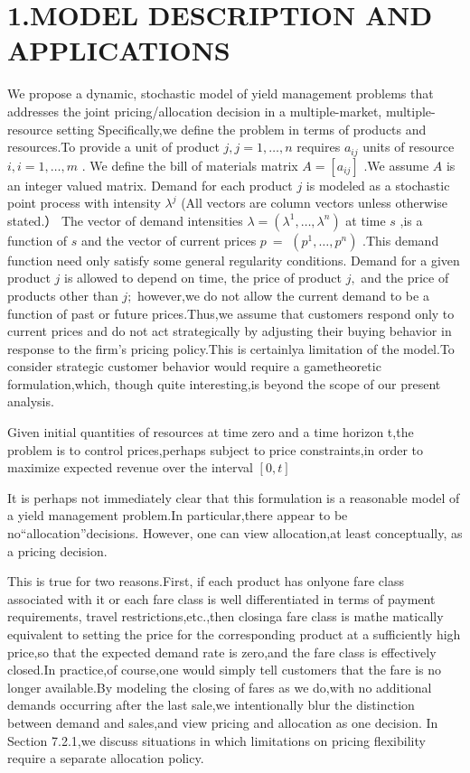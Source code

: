 \section{1.MODEL DESCRIPTION AND
APPLICATIONS}\label{model-description-and-applications}

We propose a dynamic, stochastic model of yield management problems that
addresses the joint pricing/allocation decision in a multiple-market,
multiple-resource setting Specifically,we define the problem in terms of
products and resources.To provide a unit of product
\(j , j = 1 , \ldots , n\) requires \(a _ { i j }\) units of resource
\(i , i = 1 , \ldots , m\) . We define the bill of materials matrix
\(A = [ a _ { i j } ]\) .We assume \(A\) is an integer valued matrix.
Demand for each product \(j\) is modeled as a stochastic point process
with intensity \(\lambda ^ { j }\) (All vectors are column vectors
unless otherwise stated.） The vector of demand intensities
\(\lambda = ( \lambda ^ { 1 } , \ldots , \lambda ^ { n } )\) at time
\(s\) ,is a function of \(s\) and the vector of current prices \(p \ =\)
\(( p ^ { 1 } , \ldots , p ^ { n } )\) .This demand function need only
satisfy some general regularity conditions. Demand for a given product
\(j\) is allowed to depend on time, the price of product \(j ,\) and the
price of products other than \(j ;\) however,we do not allow the current
demand to be a function of past or future prices.Thus,we assume that
customers respond only to current prices and do not act strategically by
adjusting their buying behavior in response to the firm's pricing
policy.This is certainlya limitation of the model.To consider strategic
customer behavior would require a gametheoretic formulation,which,
though quite interesting,is beyond the scope of our present analysis.

Given initial quantities of resources at time zero and a time horizon
t,the problem is to control prices,perhaps subject to price
constraints,in order to maximize expected revenue over the interval
\([ 0 , t ]\)

It is perhaps not immediately clear that this formulation is a
reasonable model of a yield management problem.In particular,there
appear to be no``allocation''decisions. However, one can view
allocation,at least conceptually, as a pricing decision.

This is true for two reasons.First, if each product has onlyone fare
class associated with it or each fare class is well differentiated in
terms of payment requirements, travel restrictions,etc.,then closinga
fare class is mathe matically equivalent to setting the price for the
corresponding product at a sufficiently high price,so that the expected
demand rate is zero,and the fare class is effectively closed.In
practice,of course,one would simply tell customers that the fare is no
longer available.By modeling the closing of fares as we do,with no
additional demands occurring after the last sale,we intentionally blur
the distinction between demand and sales,and view pricing and allocation
as one decision. In Section 7.2.1,we discuss situations in which
limitations on pricing flexibility require a separate allocation policy.

